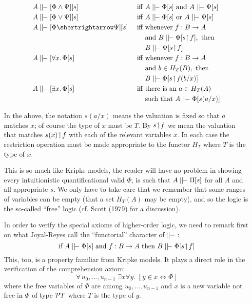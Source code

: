 \begin{align*}
  A & \mm [\Phi \land \Psi] [s] & {\textrm{ iff }} & A \mm \Phi[s] \textrm{ and } A \mm \Psi[s]\\
  A & \mm [\Phi \lor \Psi] [s] & {\textrm{ iff }} & A \mm \Phi[s] \textrm{ or } A \mm \Psi[s]\\
  A & \mm [\Phi \imp \Psi] [s] & {\textrm{ iff }} & \textrm{whenever } f:\BA\\
  &&& \textrm{and } B \mm \Phi[s \res f], \textrm{ then} \\
  &&& B \mm \Psi[s \res f]\\
  A & \mm [\forall x.\, \Phi [s] & {\textrm{ iff }} & \textrm{whenever } f:\BA\\
  &&& \textrm{and } b \in H_{T}(B), \textrm{ then} \\
  &&& B \mm \Phi[s \res f (b/x)]\\
  A & \mm [\exists x.\, \Phi [s] & {\textrm{ iff }} & \textrm{there is an } a \in H_T(A)\\
  &&& \textrm{such that } A \mm \Phi[s(a/x)]\\
\end{align*}

In the above, the notation $s(a/x)$ means the valuation is fixed
so that $a$ matches $x$; of course the type of $x$ must be $T$. By $s \res f$ we mean the valuation that matches $s(x)\res f$ with each of the relevant variables $x$. In each case the restriction opera­tion must be made appropriate to the functor $H_T$ where $T$ is the type of $x$.

This is so much like Kripke models, the reader will have no problem in showing every intuitionistic quantificational valid­ $\Phi$, is such that $A \mm \Pi[s]$ for all $A$ and all appropriate $s$. We only have to take care that we remember that some ranges of variables can be empty (that a set $H_T(A)$ may be empty), and so the logic is the so-called ``free'' logic (cf. Scott (1979) for a discussion).

In order to verify the special axioms of higher-order logic, we need to remark first on what Joyal-Reyes call the ``func­torial'' character of $\mm$ :
$$
\textrm{if } A\mm\Phi[s] \textrm{ and } f:\BA \textrm{ then } B \mm \Phi[s \res f]
$$
This, too, is a property familiar from Kripke models. It plays a direct role in the verification of the comprehension axiom:
$$
\forall\, u_0, \dots, u_{n-1} \,\, \exists x \forall y .\,\,  [ y \in x \iff \Phi]
$$
where the free variables of $\Phi$ are among $u_0, \dots, u_{n-1}$ and $x$ is a new variable not free in $\Phi$ of type $\P T$ where $T$ is the type of $y$.

